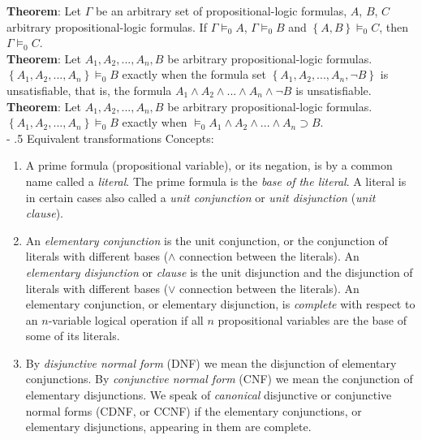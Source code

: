 \documentclass[margin=0px]{article}
\makeatletter
\renewcommand\paragraph{%
	\@startsection{paragraph}{4}{0mm}%
	{-\baselineskip}%
	{.5\baselineskip}%
	{\normalfont\normalsize\bfseries}}
\makeatother
\begin{document}
\noindent \textbf{Theorem}: Let $\Gamma$ be an arbitrary set of propositional-logic formulas, $A$, $B$, $C$ arbitrary propositional-logic formulas.
If $\Gamma \models_{0} A$, $\Gamma \models_{0} B$ and $\left\{A,B\right\} \models_{0} C$, then $\Gamma \models_{0} C$.\\

\noindent \textbf{Theorem}: Let $A_{1},A_{2},...,A_{n}, B$ be arbitrary propositional-logic formulas.
$\left\{A_{1},A_{2},...,A_{n}\right\} \models_{0} B$ exactly when the formula set $\left\{A_{1},A_{2},...,A_{n}, \neg B\right\}$
is unsatisfiable, that is, the formula $A_{1} \wedge A_{2} \wedge ... \wedge A_{n} \wedge \neg B$ is unsatisfiable.\\

\noindent \textbf{Theorem}: Let $A_{1},A_{2},...,A_{n}, B$ be arbitrary propositional-logic formulas.
$\left\{A_{1},A_{2},...,A_{n}\right\} \models_{0} B$ exactly when
$\models_{0} A_{1} \wedge A_{2} \wedge ... \wedge A_{n} \supset B$.\\

\paragraph{Equivalent transformations}
Concepts:
\begin{enumerate}
    \item	A prime formula (propositional variable), or its negation, is by a common name called a \textit{literal}. The prime formula
          is the \textit{base of the literal}. A literal is in certain cases also called a \textit{unit conjunction} or \textit{unit disjunction}
          (\textit{unit clause}).

    \item	An \textit{elementary conjunction} is the unit conjunction, or the conjunction of literals with different bases ($\wedge$ connection
          between the literals). An \textit{elementary disjunction} or \textit{clause} is the unit disjunction and the disjunction of literals with different bases
          ($\vee$ connection between the literals). An elementary conjunction, or elementary disjunction, is \textit{complete}
          with respect to an $n$-variable logical operation if all $n$ propositional variables are the base of some of its literals.

    \item	By \textit{disjunctive normal form} (DNF) we mean the disjunction of elementary conjunctions.
          By \textit{conjunctive normal form} (CNF) we mean the conjunction of elementary disjunctions. We speak of \textit{canonical}
          disjunctive or conjunctive normal forms (CDNF, or CCNF) if the
          elementary conjunctions, or elementary disjunctions, appearing in them are complete.

\end{enumerate}
\end{document}
